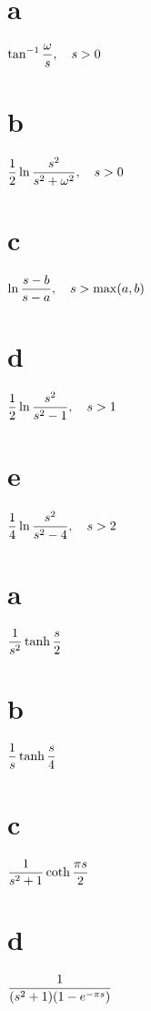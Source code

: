 \part{a}  $\displaystyle{\tan^{-1}\frac{\omega}{s},\quad s>0}$
\part{b} $\displaystyle{\frac{1}{2}\ln\frac{s^{2}}{s^{2}+\omega^{2}},\quad
s>0}$
\part{c} $\displaystyle{{\ln\frac{s-b}{s-a},\quad s>\max
(a,b)}}$

\qquad
\part{d} $\displaystyle{\frac{1}{2}\ln\frac{s^{2}}{s^{2}-1},\quad s>1}$
\part{e}  $\displaystyle{\frac{1}{4}\ln\frac{s^{2}}{s^{2}-4},\quad s>2}$

\part{a}  $\displaystyle\frac{1}{s^{2}}\tanh\frac{s}{2}$\;
\part{b} $\displaystyle\frac{1}{s}\tanh\frac{s}{4}$\;
\part{c} $\displaystyle{\frac{1}{s^{2}+1}\coth{\frac{\pi s}{2}}}$\;
\part{d} $\displaystyle\frac{1}{(s^{2}+1)(1-e^{-\pi s})}$

